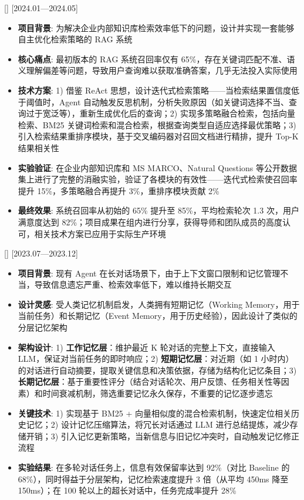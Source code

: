 \documentclass{resume-photo}
\begin{document}
[]
[2024.01—2024.05]

\begin{itemize}
  \item \textbf{项目背景}: 为解决企业内部知识库检索效率低下的问题，设计并实现一套能够自主优化检索策略的 RAG 系统
  \item \textbf{核心痛点}: 最初版本的 RAG 系统召回率仅有 65\%，存在关键词匹配不准、语义理解偏差等问题，导致用户查询难以获取准确答案，几乎无法投入实际使用
  \item \textbf{技术方案}: 1) 借鉴 ReAct 思想，设计迭代式检索策略——当检索结果置信度低于阈值时，Agent 自动触发反思机制，分析失败原因（如关键词选择不当、查询过于宽泛等），重新生成优化后的查询；2) 实现多策略融合检索，包括向量检索、BM25 关键词检索和混合检索，根据查询类型自适应选择最优策略；3) 引入检索结果重排序模块，基于交叉编码器对召回文档进行精排，提升 Top-K 结果相关性
  \item \textbf{实验验证}: 在企业内部知识库和 MS MARCO、Natural Questions 等公开数据集上进行了完整的消融实验，验证了各模块的有效性——迭代式检索使召回率提升 15\%，多策略融合再提升 3\%，重排序模块贡献 2\%
  \item \textbf{最终效果}: 系统召回率从初始的 65\% 提升至 85\%，平均检索轮次 1.3 次，用户满意度达到 82\%；项目成果在组内进行分享，获得导师和团队成员的高度认可，相关技术方案已应用于实际生产环境
\end{itemize}

[]
[2023.07—2023.12]

\begin{itemize}
  \item \textbf{项目背景}: 现有 Agent 在长对话场景下，由于上下文窗口限制和记忆管理不当，导致信息遗忘严重、检索效率低下，难以维持长期交互
  \item \textbf{设计灵感}: 受人类记忆机制启发，人类拥有短期记忆（Working Memory，用于当前任务）和长期记忆（Event Memory，用于历史经验），因此设计了类似的分层记忆架构
  \item \textbf{架构设计}: 1) \textbf{工作记忆层}：维护最近 K 轮对话的完整上下文，直接输入 LLM，保证对当前任务的即时响应；2) \textbf{短期记忆层}：对近期（如 1 小时内）的对话进行自动摘要，提取关键信息和决策依据，存储为结构化记忆条目；3) \textbf{长期记忆层}：基于重要性评分（结合对话轮次、用户反馈、任务相关性等因素）和时间衰减机制，筛选重要记忆永久保存，不重要的记忆逐步遗忘
  \item \textbf{关键技术}: 1) 实现基于 BM25 + 向量相似度的混合检索机制，快速定位相关历史记忆；2) 设计记忆压缩算法，将冗长对话通过 LLM 进行总结提炼，减少存储开销；3) 引入记忆更新策略，当新信息与旧记忆冲突时，自动触发记忆修正流程
  \item \textbf{实验结果}: 在多轮对话任务上，信息有效保留率达到 92\%（对比 Baseline 的 68\%），同时得益于分层架构，记忆检索速度提升 3 倍（从平均 450ms 降至 150ms）；在 100 轮以上的超长对话中，任务完成率提升 28\%
\end{itemize}
\end{document}
